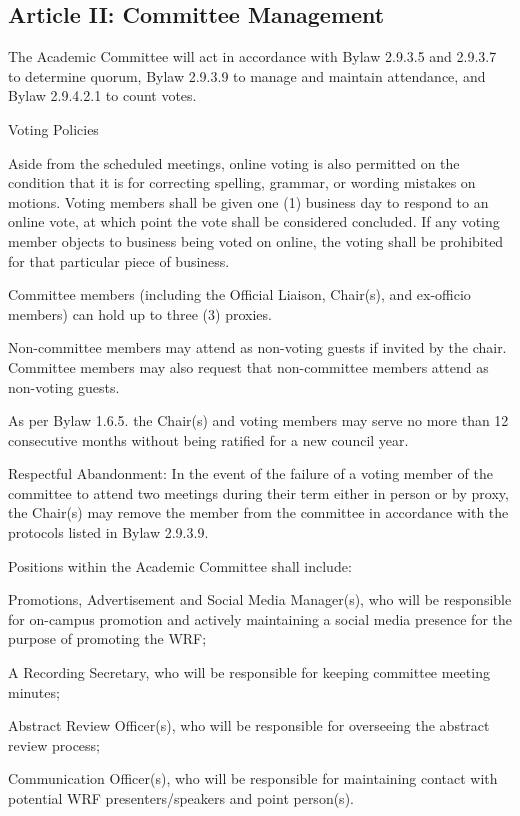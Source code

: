 \subsection{Article II: Committee Management}
\begin{longenum}[ label*=\thesubsection.\arabic*., align=left] 
\item The Academic Committee will act in accordance with Bylaw 2.9.3.5 and 2.9.3.7 to determine quorum, Bylaw 2.9.3.9 to manage and maintain attendance, and Bylaw 2.9.4.2.1 to count votes.
\item Voting Policies
	\begin{longenum}[ label*=\arabic*., align=left] 
	\item Aside from the scheduled meetings, online voting is also permitted on the condition that it is for correcting spelling, grammar, or wording mistakes on motions. Voting members shall be given one (1) business day to respond to an online vote, at which point the vote shall be considered concluded. If any voting member objects to business being voted on online, the voting shall be prohibited for that particular piece of business.
	\item Committee members (including the Official Liaison, Chair(s), and ex-officio members) can hold up to three (3) proxies.
	\end{longenum}
\item Non-committee members may attend as non-voting guests if invited by the chair. Committee members may also request that non-committee members attend as non-voting guests.
\item As per Bylaw 1.6.5. the Chair(s) and voting members may serve no more than 12 consecutive months without being ratified for a new council year.
\item Respectful Abandonment: In the event of the failure of a voting member of the committee to attend two meetings during their term either in person or by proxy, the Chair(s) may remove the member from the committee in accordance with the protocols listed in Bylaw 2.9.3.9.
\item Positions within the Academic Committee shall include:
	\begin{longenum}[ label*=\arabic*., align=left] 
	\item Promotions, Advertisement and Social Media Manager(s), who will be responsible for on-campus promotion and actively maintaining a social media presence for the purpose of promoting the WRF; 
	\item A Recording Secretary, who will be responsible for keeping committee meeting minutes;
	\item Abstract Review Officer(s), who will be responsible for overseeing the abstract review process;
	\item Communication Officer(s), who will be responsible for maintaining contact with potential WRF presenters/speakers and point person(s).
	\end{longenum}
\end{longenum}		

